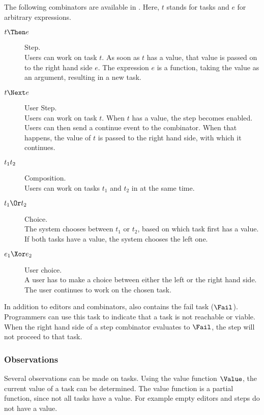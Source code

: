 The following combinators are available in \TOPHAT.
Here, $t$ stands for tasks and $e$ for arbitrary expressions.
\begin{description}
  \item[$t \Then e$] Step.\\
    Users can work on task $t$.
    As soon as $t$ has a value, that value is passed on to the right hand side $e$.
    The expression $e$ is a function, taking the value as an argument, resulting in a new task.
  \item[$t \Next e$] User Step.\\
    Users can work on task $t$.
    When $t$ has a value, the step becomes enabled.
    Users can then send a continue event to the combinator.
    When that happens, the value of $t$ is passed to the right hand side, with which it continues.
  \item[$t_1 \relax t_2$] Composition.\\
    Users can work on tasks $t_1$ and $t_2$ in at the same time.
  \item[$t_1 \Or t_2$] Choice.\\
    The system chooses between $t_1$ or $t_2$,
    based on which task first has a value.
    If both tasks have a value, the system chooses the left one.
  \item[$e_1 \Xor e_2$] User choice.\\
    A user has to make a choice between either the left or the right hand side.
    The user continues to work on the chosen task.
\end{description}

In addition to editors and combinators, \TOPHAT also contains the fail task ($\Fail$).
Programmers can use this task to indicate that a task is not reachable or viable.
When the right hand side of a step combinator evaluates to $\Fail$, the step will not proceed to that task.




\subsubsection{Observations}

Several observations can be made on tasks.
Using the value function $\Value$, the current value of a task can be determined.
The value function is a partial function, since not all tasks have a value.
For example empty editors and steps do not have a value.

